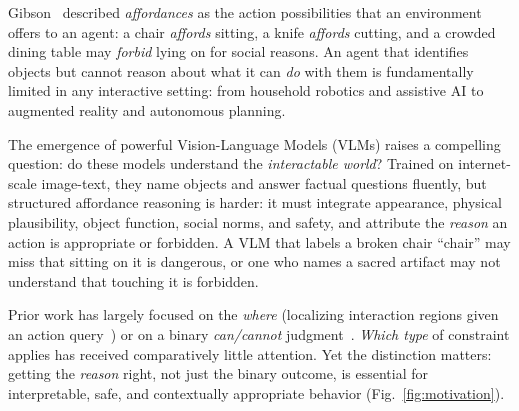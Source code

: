 \documentclass[runningheads]{llncs}
\begin{document}
Gibson~\cite{gibson2014ecological} described \emph{affordances} as the action possibilities that an environment offers to an agent: a chair \emph{affords} sitting, a knife \emph{affords} cutting, and a crowded dining table may \emph{forbid} lying on for social reasons. 
An agent that identifies objects but cannot reason about what it can \emph{do} with them is fundamentally limited in any interactive setting: from household robotics and assistive AI to augmented reality and autonomous planning.

The emergence of powerful Vision-Language Models (VLMs) raises a compelling question: do these models understand the \emph{interactable world}?
Trained on internet-scale image-text, they name objects and answer factual questions fluently, but structured affordance reasoning is harder: it must integrate appearance, physical plausibility, object function, social norms, and safety, and attribute the \emph{reason} an action is appropriate or forbidden.
A VLM that labels a broken chair ``chair'' may miss that sitting on it is dangerous, or one who names a sacred artifact may not understand that touching it is forbidden.

Prior work has largely focused on the \emph{where} (localizing interaction regions given an action query~\cite{affordancellm}) or on a binary \emph{can/cannot} judgment~\cite{do2018affordancenet}. 
\emph{Which type} of constraint applies has received comparatively little attention.
Yet the distinction matters: getting the \emph{reason} right, not just the binary outcome, is essential for interpretable, safe, and contextually appropriate behavior (Fig.~\ref{fig:motivation}).
\end{document}
